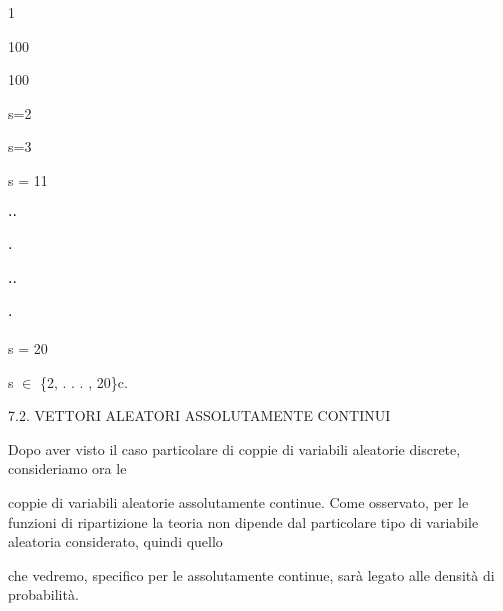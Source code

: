 \documentclass[a4paper,portrait,12pt]{article}
\begin{document}
1





100





100





\begin{flushleft}
s=2
\end{flushleft}


\begin{flushleft}
s=3
\end{flushleft}


\begin{flushleft}
s = 11
\end{flushleft}





⋅⋅


⋅


⋅⋅


⋅





\begin{flushleft}
s = 20
\end{flushleft}


\begin{flushleft}
s $\in$ \{2, . . . , 20\}c.
\end{flushleft}





\begin{flushleft}
7.2. VETTORI ALEATORI ASSOLUTAMENTE CONTINUI
\end{flushleft}


\begin{flushleft}
Dopo aver visto il caso particolare di coppie di variabili aleatorie discrete, consideriamo ora le
\end{flushleft}


\begin{flushleft}
coppie di variabili aleatorie assolutamente continue. Come osservato, per le funzioni di ripartizione la teoria non dipende dal particolare tipo di variabile aleatoria considerato, quindi quello
\end{flushleft}


\begin{flushleft}
che vedremo, specifico per le assolutamente continue, sar\`{a} legato alle densit\`{a} di probabilit\`{a}.
\end{flushleft}
\end{document}
